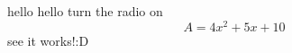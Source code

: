 \documentclass [11px] {article}
\begin{document}
hello hello turn the radio on $$A = 4x^2 + 5x +10$$ see it works!:D
\end{document}
